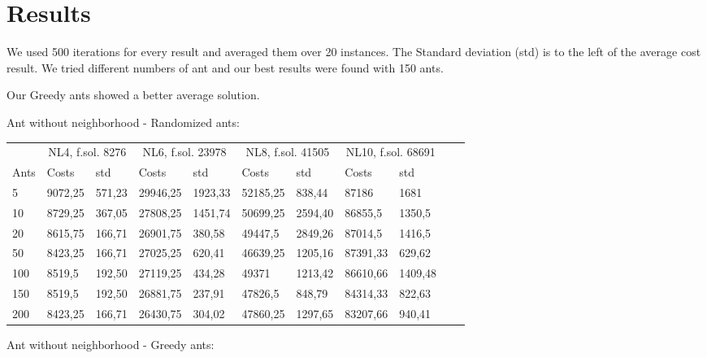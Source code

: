 \section{Results}

We used 500 iterations for every result and averaged them over 20 instances. The
Standard deviation (std) is to the left of the average cost result. We tried
different numbers of ant and our best results were found with 150 ants.

Our Greedy ants showed a better average solution.

Ant without neighborhood - Randomized ants:
\newline
\begin{minipage}[b]{1.0\textwidth}
    \begin{tabular}{ l | ll | ll | ll | ll | ll}
	\hline
	& \multicolumn{2}{c}{NL4, f.sol. 8276} & \multicolumn{2}{c}{NL6, f.sol. 23978}
	& \multicolumn{2}{c}{NL8, f.sol. 41505} & \multicolumn{2}{c}{NL10, f.sol. 68691} \\
	\cline{1-5}
	Ants & Costs & std & Costs & std & Costs & std & Costs & std \\
	\hline
	5     &  9072,25    & 571,23 &  29946,25    & 1923,33 &  52185,25   & 838,44 &  87186    & 1681 \\
	10    &  8729,25    & 367,05 &  27808,25    & 1451,74 &  50699,25   & 2594,40 &  86855,5    & 1350,5 \\
	20    &  8615,75    & 166,71 &  26901,75    & 380,58 &  49447,5    & 2849,26 &  87014,5    & 1416,5 \\
	50    &  8423,25    & 166,71 &  27025,25    & 620,41 &  46639,25   & 1205,16 &  87391,33    & 629,62 \\
	100   &  8519,5    & 192,50 &  27119,25    & 434,28 &  49371      & 1213,42 &  86610,66    & 1409,48 \\
	150   &  8519,5    & 192,50 &  26881,75    & 237,91 &  47826,5    & 848,79 &  84314,33    & 822,63 \\
	200   &  8423,25    & 166,71 &  26430,75    & 304,02 &  47860,25   & 1297,65 &  83207,66    & 940,41 \\
	\hline
	\end{tabular}
\end{minipage}
\newline
Ant without neighborhood - Greedy ants:
\newline
